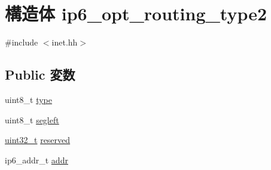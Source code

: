 \hypertarget{structNet_1_1ip6__opt__routing__type2}{
\section{構造体 ip6\_\-opt\_\-routing\_\-type2}
\label{structNet_1_1ip6__opt__routing__type2}
}


{\ttfamily \#include $<$inet.hh$>$}\subsection*{Public 変数}
\begin{DoxyCompactItemize}
\item 
uint8\_\-t \hyperlink{structNet_1_1ip6__opt__routing__type2_a1d127017fb298b889f4ba24752d08b8e}{type}
\item 
uint8\_\-t \hyperlink{structNet_1_1ip6__opt__routing__type2_adb2cddb552828de64405e671146d80a9}{segleft}
\item 
\hyperlink{Type_8hh_a435d1572bf3f880d55459d9805097f62}{uint32\_\-t} \hyperlink{structNet_1_1ip6__opt__routing__type2_aa43c4c21b173ada1b6b7568956f0d650}{reserved}
\item 
ip6\_\-addr\_\-t \hyperlink{structNet_1_1ip6__opt__routing__type2_ae32b25ff633168fbdecd8d24293034cd}{addr}
\end{DoxyCompactItemize}


